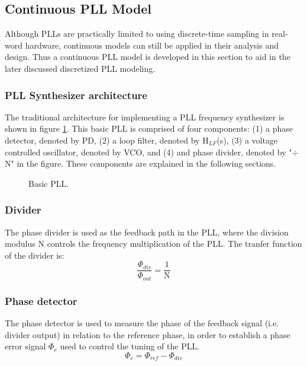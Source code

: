 \subsection{Continuous PLL Model}
Although PLLs are practically limited to using discrete-time sampling in real-word hardware, continuous models can still be applied in their analysis and design. Thus a continuous PLL model is developed in this section to aid in the later discussed discretized PLL modeling.

\subsubsection{PLL Synthesizer architecture}
The traditional architecture for implementing a PLL frequency synthesizer \cite{Razavi1996DesignOM} is shown in figure \ref{fig:basic_pll}. This basic PLL is comprised of four components: (1) a phase detector, denoted by PD, (2) a loop filter, denoted by H$_{LF}$(s), (3) a voltage controlled oscillator, denoted by VCO, and (4) and phase divider, denoted by "$\div$ N" in the figure. These components are explained in the following sections.
\begin{figure}[htb!]
	\center
	\caption{Basic PLL.}
	\label{fig:basic_pll}
\end{figure}
\FloatBarrier
\subsubsection{Divider}
The phase divider is used as the feedback path in the PLL, where the division modulus N controls the frequency multiplication of the PLL. The tranfer function of the divider is:
\begin{equation}
	\frac{\Phi_{div}}{\Phi_{out}} = \frac{1}{\mathrm{N}}
\end{equation}
\subsubsection{Phase detector}
The phase detector is used to measure the phase of the feedback signal (i.e. divider output) in relation to the reference phase, in order to establish a phase error signal $\Phi_e$ used to control the tuning of the PLL.
\begin{equation}
\Phi_e = \Phi_{ref} - \Phi_{div}
\end{equation}
